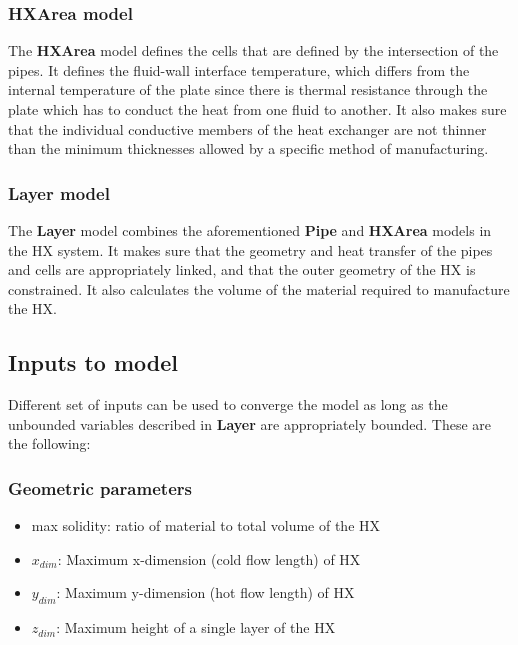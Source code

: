 \documentclass{article}
\begin{document}
\subsubsection{\textbf{HXArea} model}

The \textbf{HXArea} model defines the cells that are defined by the intersection of the pipes. It defines the fluid-wall interface temperature, which differs from the internal temperature of the plate since there is thermal resistance through the plate which has to conduct the heat from one fluid to another. It also makes sure that the individual conductive members of the heat exchanger are not thinner than the minimum thicknesses allowed by a specific method of manufacturing. 


\subsubsection{\textbf{Layer} model}

The \textbf{Layer} model combines the aforementioned \textbf{Pipe} and \textbf{HXArea} models in the HX system. It makes sure that the geometry and heat transfer of the pipes and cells are appropriately linked, and that the outer geometry of the HX is constrained. It also calculates the volume of the material required to manufacture the HX.

\subsection{Inputs to model}

Different set of inputs can be used to converge the model as long as the unbounded variables described in \textbf{Layer} are appropriately bounded. These are the following:


\subsubsection{Geometric parameters}
\begin{itemize}
\item max solidity: ratio of material to total volume of the HX
\item $x_{dim}$: Maximum x-dimension (cold flow length) of HX
\item $y_{dim}$: Maximum y-dimension (hot flow length) of HX
\item $z_{dim}$: Maximum height of a single layer of the HX
\end{itemize}
\end{document}
